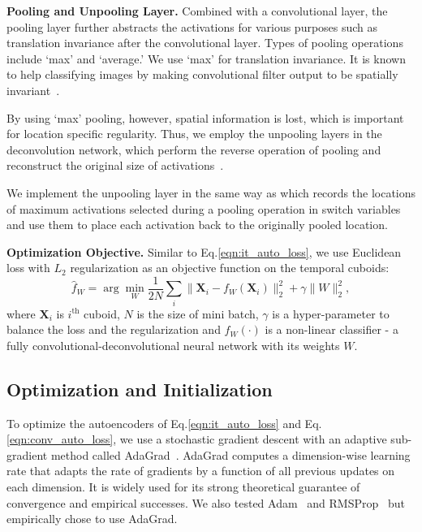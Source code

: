 \documentclass[10pt,twocolumn,letterpaper]{article}
\begin{document}
\vspace{.5em}
\noindent \textbf{Pooling and Unpooling Layer.}
Combined with a convolutional layer, the pooling layer further abstracts the activations for various purposes such as translation invariance after the convolutional layer.
Types of pooling operations include `max' and `average.'
We use `max' for translation invariance.
It is known to help classifying images by making convolutional filter output to be spatially invariant~\cite{krizhevsky2012imagenet}.

By using `max' pooling, however, spatial information is lost, which is important for location specific regularity.
Thus, we employ the unpooling layers in the deconvolution network, which perform the reverse operation of pooling and reconstruct the original size of activations~\cite{nohHH15,zeiler2014visualizing,zeiler2011adaptive}. 

We implement the unpooling layer in the same way as \cite{zeiler2014visualizing,zeiler2011adaptive} which records the locations of maximum activations selected during a pooling operation in switch variables and use them to place each activation back to the originally pooled location.


\vspace{.5em}
\noindent \textbf{Optimization Objective.}
Similar to Eq.\ref{eqn:it_auto_loss}, we use Euclidean loss with $L_2$ regularization as an objective function on the temporal cuboids:
\begin{equation}
	\hat{f}_W = \arg \min_{W} \frac{1}{2N} \sum_i \| \textbf{X}_i - f_W(\textbf{X}_i) \|_2^2 + \gamma \|W\|_2^2,
	\label{eqn:conv_auto_loss}
\end{equation}
where $\textbf{X}_i$ is $i^\text{th}$ cuboid, $N$ is the size of mini batch, $\gamma$ is a hyper-parameter to balance the loss and the regularization and $f_W(\cdot)$ is a non-linear classifier - a fully convolutional-deconvolutional neural network with its weights $W$.



\subsection{Optimization and Initialization}
To optimize the autoencoders of Eq.\ref{eqn:it_auto_loss} and Eq.\ref{eqn:conv_auto_loss}, we use a stochastic gradient descent with an adaptive sub-gradient method called AdaGrad~\cite{duchi2011adaptive}.
AdaGrad computes a dimension-wise learning rate that adapts the rate of gradients by a function of all previous updates on each dimension.
It is widely used for its strong theoretical guarantee of convergence and empirical successes.
We also tested Adam~\cite{kingmaB15} and RMSProp~\cite{tielemanH12} but empirically chose to use AdaGrad.
\end{document}
